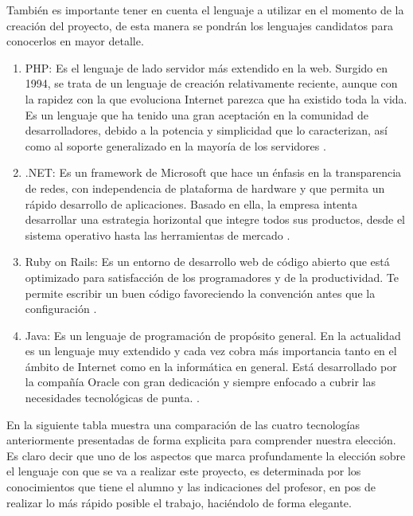 \documentclass[a4paper,12pt,openany,oneside]{book}
\begin{document}
También es importante tener en cuenta el lenguaje a utilizar en el momento de la creación del proyecto, de esta manera se pondrán los lenguajes candidatos para conocerlos en mayor detalle.

\begin{enumerate}

\item PHP: Es el lenguaje de lado servidor más extendido en la web. Surgido en 1994, se trata de un lenguaje de creación relativamente reciente, aunque con la rapidez con la que evoluciona Internet parezca que ha existido toda la vida. Es un lenguaje que ha tenido una gran aceptación en la comunidad de desarrolladores, debido a la potencia y simplicidad que lo caracterizan, así como al soporte generalizado en la mayoría de los servidores \cite{data7}.

\item .NET: Es un framework de Microsoft que hace un énfasis en la transparencia de redes, con independencia de plataforma de hardware y que permita un rápido desarrollo de aplicaciones. Basado en ella, la empresa intenta desarrollar una estrategia horizontal que integre todos sus productos, desde el sistema operativo hasta las herramientas de mercado \cite{data8}.

\item Ruby on Rails: Es un entorno de desarrollo web de código abierto que está optimizado para satisfacción de los programadores y de la productividad. Te permite escribir un buen código favoreciendo la convención antes que la configuración \cite{data9}.

\item Java: Es un lenguaje de programación de propósito general. En la actualidad es un lenguaje muy extendido y cada vez cobra más importancia tanto en el ámbito de Internet como en la informática en general. Está desarrollado por la compañía Oracle con gran dedicación y siempre enfocado a cubrir las necesidades tecnológicas de punta. \cite{data10}.
\end{enumerate}

En la siguiente tabla muestra una comparación de las cuatro tecnologías anteriormente presentadas de forma explicita para comprender nuestra elección. Es claro decir que uno de los aspectos que marca profundamente la elección sobre el lenguaje con que se va a realizar este proyecto, es determinada por los conocimientos que tiene el alumno y las indicaciones del profesor, en pos de realizar lo más rápido posible el trabajo, haciéndolo de forma elegante. 
\end{document}
